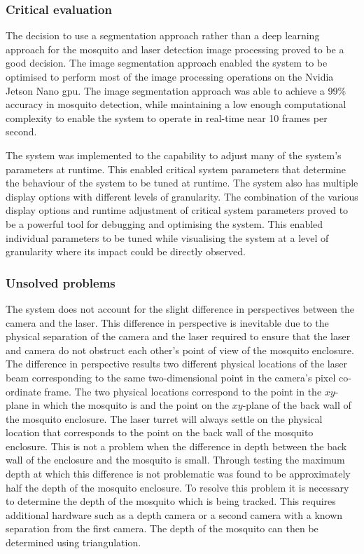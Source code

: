 \subsubsection{Critical evaluation}
The decision to use a segmentation approach rather than a deep learning approach for the mosquito and laser detection image processing proved to be a good decision. The image segmentation approach enabled the system to be optimised to perform most of the image processing operations on the Nvidia Jetson Nano \gls{gpu}. The image segmentation approach was able to achieve a 99\% accuracy in mosquito detection, while maintaining a low enough computational complexity to enable the system to operate in real-time near 10 frames per second.

The system was implemented to the capability to adjust many of the system's parameters at runtime. This enabled critical system parameters that determine the behaviour of the system to be tuned at runtime. The system also has multiple display options with different levels of granularity. The combination of the various display options and runtime adjustment of critical system parameters proved to be a powerful tool for debugging and optimising the system. This enabled individual parameters to be tuned while visualising the system at a level of granularity where its impact could be directly observed.

\subsubsection{Unsolved problems}\label{sec:unsolved_problems}
The system does not account for the slight difference in perspectives between the camera and the laser. This difference in perspective is inevitable due to the physical separation of the camera and the laser required to ensure that the laser and camera do not obstruct each other's point of view of the mosquito enclosure. The difference in perspective results two different physical locations of the laser beam corresponding to the same two-dimensional point in the camera's pixel co-ordinate frame. The two physical locations correspond to the point in the $xy$-plane in which the mosquito is and the point on the $xy$-plane of the back wall of the mosquito enclosure. The laser turret will always settle on the physical location that corresponds to the point on the back wall of the mosquito enclosure. This is not a problem when the difference in depth between the back wall of the enclosure and the mosquito is small. Through testing the maximum depth at which this difference is not problematic was found to be approximately half the depth of the mosquito enclosure. To resolve this problem it is necessary to determine the depth of the mosquito which is being tracked. This requires additional hardware such as a depth camera or a second camera with a known separation from the first camera. The depth of the mosquito can then be determined using triangulation.

